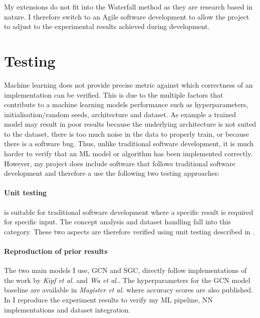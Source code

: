 My extensions do not fit into the Waterfall method as they are research based in nature. I therefore switch to an Agile software development \cite{beck2001manifesto} to allow the project to adjust to the experimental results achieved during development.

\section{Testing}
\label{sec:testing}


Machine learning does not provide precise metric against which correctness of an implementation can be verified.
This is due to the multiple factors that contribute to a machine learning models performance such as hyperparameters, initialisation/random seeds, architecture and dataset.
As example a trained model may result in poor results because the underlying architecture is not suited to the dataset, there is too much noise in the data to properly train, or because there is a software bug.
Thus, unlike traditional software development, it is much harder to verify that an ML model or algorithm has been implemented correctly.
However, my project does include software that follows traditional software development and therefore a use the following two testing approaches:

\paragraph{Unit testing}
is suitable for traditional software development where a specific result is required for specific input.
The concept analysis and dataset handling fall into this category.
These two aspects are therefore verified using unit testing described in .

\paragraph{Reproduction of prior results}
The two main models I use, GCN and SGC, directly follow implementations of the work by \textit{Kipf et al.}\cite{kipf2016semi} and \textit{Wu et al.}\cite{wu2019simplifying}.
The hyperparameters for the GCN model baseline are available in \textit{Magister et al.}\cite{magister2021gcexplainer} where accuracy scores are also published.
In  I reproduce the experiment results to verify my ML pipeline, NN implementations and dataset integration.

